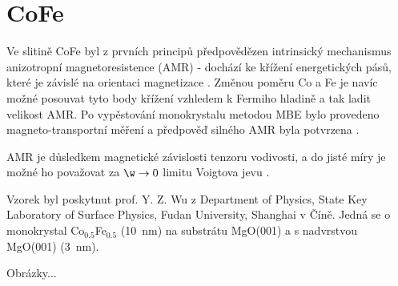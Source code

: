\section{CoFe \cite{AMRCoFe}}

Ve slitině CoFe byl z prvních principů předpovědězen intrinsický mechanismus anizotropní magnetoresistence (AMR) - dochází ke křížení energetických pásů, které je závislé na orientaci magnetizace \cite{AMRCoFe}.
Změnou poměru Co a Fe je navíc možné posouvat tyto body křížení vzhledem k Fermiho hladině a tak ladit velikost AMR.
Po vypěstování monokrystalu metodou MBE bylo provedeno magneto-transportní měření a předpověď silného AMR byla potvrzena \cite{AMRCoFe}.

AMR je důsledkem magnetické závislosti tenzoru vodivosti, a do jisté míry je možné ho považovat za $\w\to 0$ limitu Voigtova jevu \cite{Ostatnicky}.

Vzorek byl poskytnut prof. Y. Z. Wu z Department of Physics, State Key Laboratory of Surface Physics, Fudan University, Shanghai v Číně.
Jedná se o monokrystal Co$_{\num{0.5}}$Fe$_{\num{0.5}}$ (\SI{10}{\nano\meter}) na substrátu MgO(001) a s nadvrstvou MgO(001) (\SI{3}{\nano\meter}).

Obrázky...
